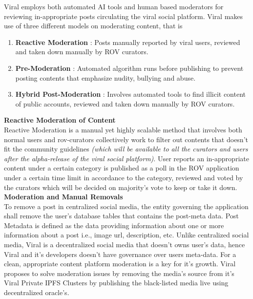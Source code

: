 \documentclass[conference]{IEEEtran}
\begin{document}
Viral employs both automated AI tools and human based moderators for reviewing in-appropriate posts circulating the viral social platform. Viral makes use of three different models on moderating content, that is
\begin{enumerate}[wide, labelwidth=!, labelindent=0pt]
\item \textbf{Reactive Moderation} : Posts manually reported by viral users, reviewed and taken down manually by ROV curators.
\item \textbf{Pre-Moderation} : Automated algorithm runs before publishing to prevent posting contents that emphasize nudity, bullying and abuse.
\item \textbf{Hybrid Post-Moderation} : Involves automated tools to find illicit content of public accounts, reviewed and taken down manually by ROV curators.
\end{enumerate}

\textbf{Reactive Moderation of Content}\\

Reactive Moderation is a manual yet highly scalable method that involves both normal users and rov-curators collectively work to filter out contents that doesn't fit the community guidelines \textit{(which will be available to all the curators and users after the alpha-release of the viral social platform)}. User reports an in-appropriate content under a certain category is published as a poll in the ROV application under a certain time limit in accordance to the category, reviewed and voted by the curators which will be decided on majority's vote to keep or take it down.\\

\textbf{Moderation and Manual Removals}\\

To remove a post in centralized social media, the entity governing the application shall remove the user's database tables that contains the post-meta data. Post Metadata is defined as the data providing information about one or more information about a post i.e., image url, description, etc. Unlike centralized social media, Viral is a decentralized social media that doesn't owns user's data, hence Viral and it's developers doesn't have governance over users meta-data. For a clean, appropriate content platform moderation is a key for it's growth. Viral proposes to solve moderation issues by removing the media's source from it's Viral Private IPFS Clusters by publishing the black-listed media live using decentralized oracle's.\\
\end{document}
